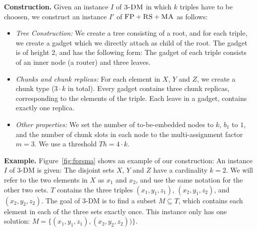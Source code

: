 \documentclass[conference,10pt]{IEEEtran}
\newcommand{\maciek}[1]{\textcolor{brown}{maciek: #1}}
\newcommand{\stefan}[1]{\textcolor{blue}{stefan: #1}}
\newcommand{\MaFactor}{m}
\newcommand{\FP}{\textsc{FP}}
\newcommand{\RS}{\textsc{RS}}
\newcommand{\MA}{\textsc{MA}}
\newcommand{\CostTrans}{\ensuremath{b_1}}
\newcommand{\TDM}{\textsc{3-DM}}
\newcommand{\Thr}{\ensuremath{Th}}
\begin{document}
\textbf{Construction.}
Given an instance $I$ of $\TDM$ in which $k$ triples have to be
choosen, we construct an instance $I'$ of
$\FP+\RS+\MA$ as follows:
\begin{itemize}
\item \emph{Tree Construction:} We create a tree consisting of a root,
and for each triple, we create a gadget which we directly attach as
child of the root. The gadget is of height 2,
and has the following form:
The gadget of each triple consists of an inner node (a router) and three leaves.
\item \emph{Chunks and chunk replicas:} For each element in $X$, $Y$ and $Z$,
 we create a chunk type
($3 \cdot k$ in total). Every gadget contains three chunk replicas,
corresponding to the elements of the triple. Each leave in a gadget, contains
exactly one replica.
\item \emph{Other properties:} We set the number of to-be-embedded nodes to $k$,
$\CostTrans$ to $1$, and the number of chunk slots in each node to the multi-assignment factor
$\MaFactor=3$.
We use a threshold $\Thr= 4
\cdot k$.
\end{itemize}

\textbf{Example.} Figure~\ref{fig:fprsma} shows an example of our construction: An
instance $I$ of 3-DM is given: The disjoint sets $X$, $Y$ and $Z$ have a
cardinality $k=2$. We will refer to the two elements in $X$ as $x_1$ and $x_2$,
and use the same notation for the other two sets. $T$ contains the three triples
$(x_1, y_1,
z_1)$, $(x_2, y_1, z_2)$, and $(x_2, y_2, z_2)$. The goal of 3-DM is to find a
subset $M \subseteq T$, which contains each element in each of the three sets
exactly once. This instance only has one solution: $M =
\{(x_1,y_1,z_1),(x_2,y_2,z_2))\}$.
\end{document}

